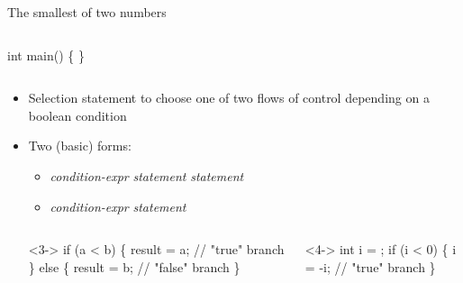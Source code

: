 \begin{frame}[fragile]{The smallest of two numbers}
\begin{columns}[T]
\begin{column}{.5\textwidth}
\begin{codeblock}
{int main()
\{
\}}\end{codeblock}

    \end{column}
  \end{columns}


\end{frame}

\begin{frame}[fragile]{}

  \begin{itemize}
  \item<1-> Selection statement to choose one of two flows of control depending on a
    boolean condition
  \item<2-> Two (basic) forms:
    \begin{itemize}
    \item<3->  \textit{condition-expr} \code{)} \textit{statement}  \textit{statement}
    \item<4->  \textit{condition-expr} \code{)} \textit{statement}
    \end{itemize}

  \begin{columns}[t]

    \begin{column}{.45\textwidth}

      \begin{codeblock}<3->{
\alert{if} (a < b) \{
  result = a;   // "true" branch
\} \alert{else} \{
  result = b;   // "false" branch
\}}\end{codeblock}

    \end{column}

    \begin{column}{.45\textwidth}
      \begin{codeblock}<4->{
int i = \ddd;
\alert{if} (i < 0) \{
  i = -i;   // "true" branch
\}}\end{codeblock}

    \end{column}


\end{columns}
\end{itemize}
\end{frame}
